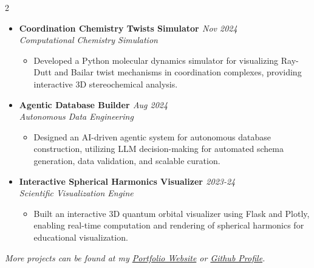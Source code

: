 \documentclass[a4paper,10pt]{article}
\newcommand{\resumeProject}[4]{
    \item\small{
        \textbf{#1} \hfill \textit{#2}\\
        \textit{#3}\\
        \begin{itemize}[leftmargin=1.5em,label=\textbullet,nosep,itemsep=0.5pt]
            #4
        \end{itemize}
    }\vspace{2pt}
}
\begin{document}
{\begin{multicols}{2}
\begin{itemize}[leftmargin=*,label={},itemsep=4pt]
    \resumeProject{Coordination Chemistry Twists Simulator \href{https://github.com/Shuvam-Banerji-Seal/Ray-Dutt-and-Bailar-Twists-Simulator}{\faGithub}}{Nov 2024}
    {Computational Chemistry Simulation}
    {\item Developed a Python molecular dynamics simulator for visualizing Ray-Dutt and Bailar twist mechanisms in coordination complexes, providing interactive 3D stereochemical analysis.}
     
    \resumeProject{Agentic Database Builder \href{https://github.com/Shuvam-Banerji-Seal/Agentic_Database_Builder}{\faGithub}}{Aug 2024}
    {Autonomous Data Engineering}
    {\item Designed an AI-driven agentic system for autonomous database construction, utilizing LLM decision-making for automated schema generation, data validation, and scalable curation.}
     
    \resumeProject{Interactive Spherical Harmonics Visualizer \href{https://github.com/Shuvam-Banerji-Seal/simple-spherical-harmonics-visualizer}{\faGithub}}{2023-24}
    {Scientific Visualization Engine}
    {\item Built an interactive 3D quantum orbital visualizer using Flask and Plotly, enabling real-time computation and rendering of spherical harmonics for educational visualization.}
     
\end{itemize}
\end{multicols}
\vspace{-5pt}
\begin{center}
    \small{\textit{More projects can be found at my \href{https://shuvam-banerji-seal.github.io}{Portfolio Website} or \href{https://github.com/Shuvam-Banerji-Seal}{Github Profile}.}}
\end{center}
}
\end{document}
